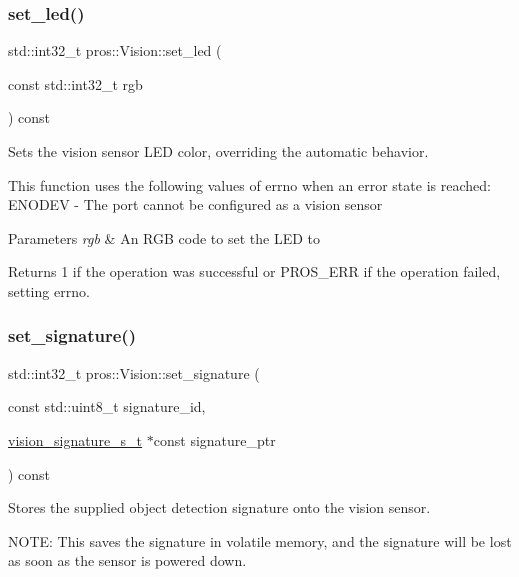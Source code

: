 \subsubsection{\texorpdfstring{set\+\_\+led()}{set\_led()}}
{\footnotesize\ttfamily std\+::int32\+\_\+t pros\+::\+Vision\+::set\+\_\+led (\begin{DoxyParamCaption}\item[{const std\+::int32\+\_\+t}]{rgb }\end{DoxyParamCaption}) const}



Sets the vision sensor L\+ED color, overriding the automatic behavior. 

This function uses the following values of errno when an error state is reached\+: E\+N\+O\+D\+EV -\/ The port cannot be configured as a vision sensor


\begin{DoxyParams}{Parameters}
{\em rgb} & An R\+GB code to set the L\+ED to\\
\hline
\end{DoxyParams}
\begin{DoxyReturn}{Returns}
1 if the operation was successful or P\+R\+O\+S\+\_\+\+E\+RR if the operation failed, setting errno. 
\end{DoxyReturn}
\mbox{\label{classpros_1_1Vision_a71c3c083ad5538a544e377ebc510cb75}} 
\subsubsection{\texorpdfstring{set\+\_\+signature()}{set\_signature()}}
{\footnotesize\ttfamily std\+::int32\+\_\+t pros\+::\+Vision\+::set\+\_\+signature (\begin{DoxyParamCaption}\item[{const std\+::uint8\+\_\+t}]{signature\+\_\+id,  }\item[{\hyperlink{vision_8h_a135c729c7277f6cc019c2924088a5fd5}{vision\+\_\+signature\+\_\+s\+\_\+t} $\ast$const}]{signature\+\_\+ptr }\end{DoxyParamCaption}) const}



Stores the supplied object detection signature onto the vision sensor. 

N\+O\+TE\+: This saves the signature in volatile memory, and the signature will be lost as soon as the sensor is powered down.

